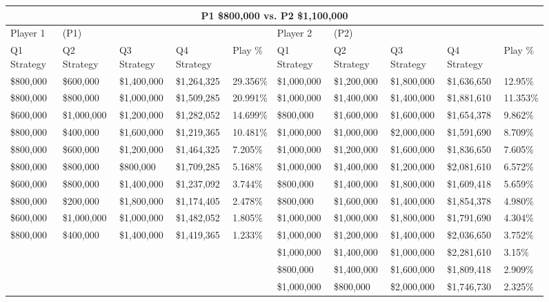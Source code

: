 \documentclass[11pt]{article}
\begin{document}
\begin{figure}
\tiny
\begin{tabular}{ |p{1.0cm}p{1.0cm}p{1.0cm}p{2.0cm}|p{1.0cm}||p{1.0cm}p{1.0cm}p{1.0cm}p{2.0cm}|p{1.0cm}|}
\hline
\multicolumn{10}{|c|}{P1 \$800,000 vs. P2 \$1,100,000} \\
\hline
Player 1 & (P1) & & & & Player 2 & (P2) & & & \\
\hline
Q1 Strategy & Q2 Strategy & Q3 Strategy & Q4 Strategy  &  Play \% & Q1 Strategy & Q2 Strategy & Q3 Strategy & Q4 Strategy  &  Play \%\\
\hline
\$800,000 & \$600,000 & \$1,400,000 & \$1,264,325 & 29.356\% & \$1,000,000 & \$1,200,000 & \$1,800,000 & \$1,636,650 & 12.95\% \\
\$800,000 & \$800,000 & \$1,000,000 & \$1,509,285 & 20.991\% & \$1,000,000 & \$1,400,000 & \$1,400,000 & \$1,881,610 & 11.353\% \\
\$600,000 & \$1,000,000 & \$1,200,000 & \$1,282,052 & 14.699\% & \$800,000 & \$1,600,000 & \$1,600,000 & \$1,654,378 & 9.862\% \\
\$800,000 & \$400,000 & \$1,600,000 & \$1,219,365 & 10.481\% & \$1,000,000 & \$1,000,000 & \$2,000,000 & \$1,591,690 & 8.709\% \\
\$800,000 & \$600,000 & \$1,200,000 & \$1,464,325 & 7.205\% & \$1,000,000 & \$1,200,000 & \$1,600,000 & \$1,836,650 & 7.605\% \\
\$800,000 & \$800,000 & \$800,000 & \$1,709,285 & 5.168\% & \$1,000,000 & \$1,400,000 & \$1,200,000 & \$2,081,610 & 6.572\% \\
\$600,000 & \$800,000 & \$1,400,000 & \$1,237,092 & 3.744\% & \$800,000 & \$1,400,000 & \$1,800,000 & \$1,609,418 & 5.659\% \\
\$800,000 & \$200,000 & \$1,800,000 & \$1,174,405 & 2.478\% & \$800,000 & \$1,600,000 & \$1,400,000 & \$1,854,378 & 4.980\% \\
\$600,000 & \$1,000,000 & \$1,000,000 & \$1,482,052 & 1.805\% & \$1,000,000 & \$1,000,000 & \$1,800,000 & \$1,791,690 & 4.304\% \\
\$800,000 & \$400,000 & \$1,400,000 & \$1,419,365 & 1.233\% & \$1,000,000 & \$1,200,000 & \$1,400,000 & \$2,036,650 & 3.752\% \\
& & & & & \$1,000,000 & \$1,400,000 & \$1,000,000 & \$2,281,610 & 3.15\% \\
& & & & & \$800,000 & \$1,400,000 & \$1,600,000 & \$1,809,418 & 2.909\% \\
& & & & & \$1,000,000 & \$800,000 & \$2,000,000 & \$1,746,730 & 2.325\% \\

\end{tabular}
\end{figure}
\end{document}
